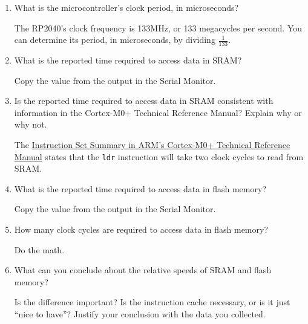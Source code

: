 \begin{description}
\end{description}

\begin{enumerate}
    \item What is the microcontroller's clock period, in microseconds?

        The RP2040's clock frequency is 133MHz, or 133 megacycles per second.
        You can determine its period, in microseconds, by dividing $\frac{1}{133}$.

    \item What is the reported time required to access data in SRAM?

        Copy the value from the output in the Serial Monitor.

    \item Is the reported time required to access data in SRAM consistent with
        information in the Cortex-M0+ Technical Reference Manual?
        Explain why or why not.

        The \href{https://developer.arm.com/documentation/ddi0484/c/Programmers-Model/Instruction-set-summary}{Instruction Set Summary in ARM's Cortex-M0+ Technical Reference Manual}
        states that the \lstinline{ldr} instruction will take two clock cycles to read from SRAM\@.

    \item What is the reported time required to access data in flash memory?

        Copy the value from the output in the Serial Monitor.

    \item How many clock cycles are required to access data in flash memory?

        Do the math.

    \item What can you conclude about the relative speeds of SRAM and flash memory?

        Is the difference important?
        Is the instruction cache necessary, or is it just ``nice to have''?
        Justify your conclusion with the data you collected.

\end{enumerate}

\begin{description}
\end{description}


